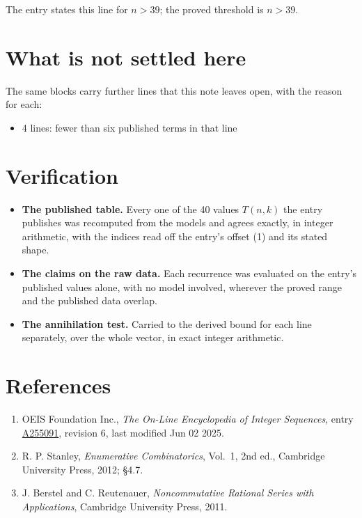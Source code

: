 \documentclass[11pt]{article}
\theoremstyle{definition}
\begin{document}
The entry states this line for $n > 39$; the proved threshold is $n > 39$.

\section{What is not settled here}

The same blocks carry further lines that this note leaves open, with the reason for each:

\begin{itemize}

\item 4 lines: fewer than six published terms in that line

\end{itemize}

\section{Verification}

\begin{itemize}

\item {\bfseries The published table.} Every one of the 40 values $T(n,k)$ the entry publishes was recomputed from the models and agrees exactly, in integer arithmetic, with the indices read off the entry's offset (1) and its stated shape.

\item {\bfseries The claims on the raw data.} Each recurrence was evaluated on the entry's published values alone, with no model involved, wherever the proved range and the published data overlap.

\item {\bfseries The annihilation test.} Carried to the derived bound for each line separately, over the whole vector, in exact integer arithmetic.

\end{itemize}

\section{References}

\begin{enumerate}

\item OEIS Foundation Inc., \emph{The On-Line Encyclopedia of Integer Sequences}, entry \href{https://oeis.org/A255091}{A255091}, revision 6, last modified Jun 02 2025.

\item R. P. Stanley, \emph{Enumerative Combinatorics}, Vol.~1, 2nd ed., Cambridge University Press, 2012; \S4.7.

\item J. Berstel and C. Reutenauer, \emph{Noncommutative Rational Series with Applications}, Cambridge University Press, 2011.

\end{enumerate}
\end{document}
